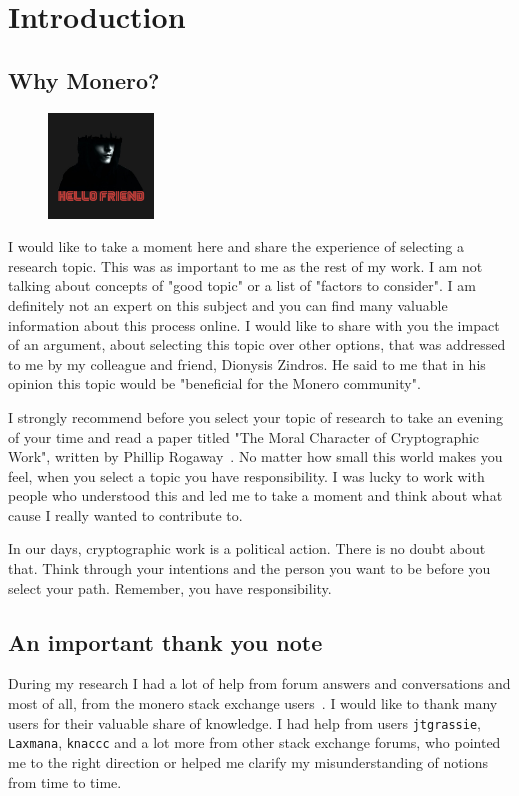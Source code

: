 \setcounter{chapter}{-1}
\chapter{Introduction}
%
\section{Why Monero?}
\setlength{\intextsep}{0pt}
\begin{figure}
\centering
\includegraphics[width=0.25\textwidth]{Images/Introduction/hello.jpg}
\end{figure}
I would like to take a moment here and share the experience of selecting a research topic. This was as important to me as the rest of my work. I am not talking about concepts of "good topic" or a list of "factors to consider". I am definitely not an expert on this subject and you can find many valuable information about this process online. I would like to share with you the impact of an argument, about selecting this topic over other options, that was addressed to me by my colleague and friend, Dionysis Zindros. He said to me that in his opinion this topic would be "beneficial for the Monero community".

I strongly recommend before you select your topic of research to take an evening of your time and read a paper titled "The Moral Character of Cryptographic Work", written by Phillip Rogaway~\cite{moral}. No matter how small this world makes you feel, when you select a topic you have responsibility. I was lucky to work with people who understood this and led me to take a moment and think about what cause I really wanted to contribute to.

In our days, cryptographic work is a political action. There is no doubt about that. Think through your intentions and the person you want to be before you select your path. Remember, you have responsibility.
%
\section{An important thank you note}
During my research I had a lot of help from forum answers and conversations and most of all, from the monero stack exchange users~\cite{stackexchange}. I would like to thank many users for their valuable share of knowledge. I had help from users \verb|jtgrassie|, \verb|Laxmana|, \verb|knaccc| and a lot more from other stack exchange forums, who pointed me to the right direction or helped me clarify my misunderstanding of notions from time to time.
\pagebreak

